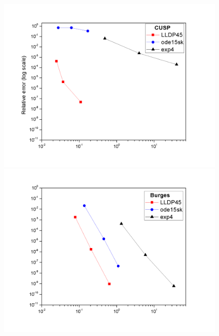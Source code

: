 \documentclass{article}
\title{}
\author{}
\begin{document}
\thispagestyle{empty}
\begin{figure}
	\centering
%	
%	
\vspace{-0.8in}
\begin{minipage}{.5\textwidth}
	\hspace{-0.8in}\includegraphics[scale=0.4]{CUSP.png}
\end{minipage}
\begin{minipage}{.49\textwidth}
	\includegraphics[scale=0.4]{Burges.png}

\end{minipage}
\end{figure}
\end{document}
